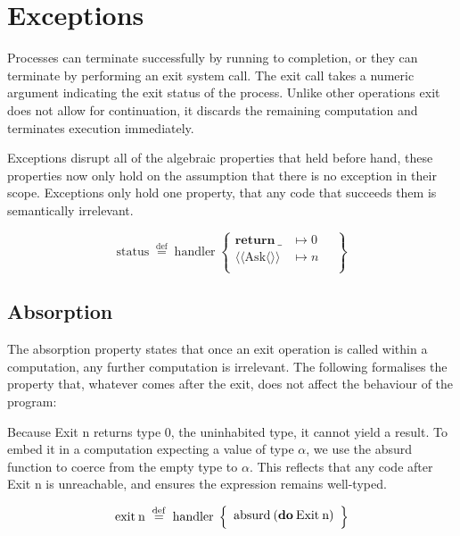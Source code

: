 \documentclass[logo,bsc,singlespacing,parskip]{infthesis}
\begin{document}
\section{Exceptions}
Processes can terminate successfully by running to completion, or they can terminate by performing an exit system call. The exit call takes a numeric argument indicating the exit status of the process. Unlike other operations exit does not allow for continuation, it discards the remaining computation and terminates execution immediately.

Exceptions disrupt all of the algebraic properties that held before hand, these properties now only hold on the assumption that there is no exception in their scope. Exceptions only hold one property, that any code that succeeds them is semantically irrelevant.



\[
\mathrm{status} \;\overset{\mathrm{def}}{=}\;
\mathrm{handler} \;\left\{
\begin{array}{ll}
  \mathrm{\textbf{return}\:\_} & \mapsto 0 \quad\\[0.5ex]
  \langle\!\langle \mathrm{Ask} \langle\rangle\rangle &  \mapsto n \quad\\[0.5ex]
 
\end{array}
\right\}
\]

\subsection*{Absorption}

The absorption property states that once an exit operation is called within a computation, any further computation is irrelevant. The following formalises the property that, whatever comes after the exit, does not affect the behaviour of the program:


Because Exit n returns type 0, the uninhabited type, it cannot yield a result. To embed it in a computation expecting a value of type $\alpha$, we use the absurd function to coerce from the empty type to $\alpha$. This reflects that any code after Exit n is unreachable, and ensures the expression remains well-typed.

\[
\mathrm{exit\:n} \;\overset{\mathrm{def}}{=}\;
\mathrm{handler} \;\left\{
\begin{array}{l}
  \text{absurd\:(\textbf{do}\:Exit\:n)} \quad\\[0.5ex]

\end{array}
\right\}
\]
\end{document}
